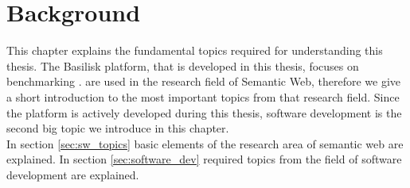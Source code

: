 \chapter{Background}
\label{ch:background}

This chapter explains the fundamental topics required for understanding this thesis.
The Basilisk platform, that is developed in this thesis, focuses on benchmarking \tsp{}.
\tsp{} are used in the research field of Semantic Web, therefore we give a short introduction to the most important topics from that research field.
Since the platform is actively developed during this thesis, software development is the second big topic we introduce in this chapter.
\\

In section \ref{sec:sw_topics} basic elements of the research area of semantic web are explained.
In section \ref{sec:software_dev} required topics from the field of software development are explained.




